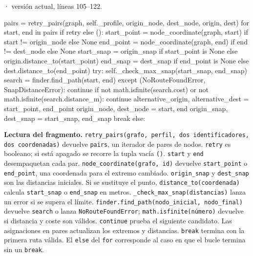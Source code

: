 \documentclass[11pt,a4paper]{article}
\begin{document}
\smallskip
{\footnotesize\texttt{} · versión actual, líneas 105--122.}\par
\begin{Codigo}[firstnumber=105]
            pairs = retry_pairs(graph, self._profile, origin_node, dest_node, origin, dest)
            for start, end in pairs if retry else ():
                start_point = node_coordinate(graph, start) if start != origin_node else None
                end_point = node_coordinate(graph, end) if end != dest_node else None
                start_snap = origin_snap if start_point is None else origin.distance_to(start_point)
                end_snap = dest_snap if end_point is None else dest.distance_to(end_point)
                try:
                    self._check_max_snap(start_snap, end_snap)
                    search = finder.find_path(start, end)
                except (NoRouteFoundError, SnapDistanceError):
                    continue
                if not math.isfinite(search.cost) or not math.isfinite(search.distance_m):
                    continue
                alternative_origin, alternative_dest = start_point, end_point
                origin_node, dest_node = start, end
                origin_snap, dest_snap = start_snap, end_snap
                break
            else:
\end{Codigo}

\textbf{Lectura del fragmento.} \texttt{retry\_pairs(grafo, perfil, dos identificadores, dos coordenadas)} devuelve \texttt{pairs}, un iterador de pares de nodos. \texttt{retry} es booleano; si está apagado se recorre la tupla vacía \texttt{()}. \texttt{start} y \texttt{end} desempaquetan cada par. \texttt{node\_coordinate(grafo, id)} devuelve \texttt{start\_point} o \texttt{end\_point}, una coordenada para el extremo cambiado. \texttt{origin\_snap} y \texttt{dest\_snap} son las distancias iniciales. Si se sustituye el punto, \texttt{distance\_to(coordenada)} calcula \texttt{start\_snap} o \texttt{end\_snap} en metros. \texttt{\_check\_max\_snap(distancias)} lanza un error si se supera el límite. \texttt{finder.find\_path(nodo\_inicial, nodo\_final)} devuelve \texttt{search} o lanza \texttt{NoRouteFoundError}; \texttt{math.isfinite(número)} devuelve si distancia y coste son válidos. \texttt{continue} prueba el siguiente candidato. Las asignaciones en pares actualizan los extremos y distancias. \texttt{break} termina con la primera ruta válida. El \texttt{else} del \texttt{for} corresponde al caso en que el bucle termina sin un \texttt{break}.
\end{document}
